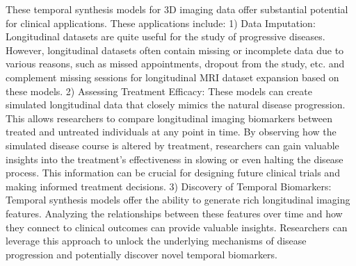 These temporal synthesis models for 3D imaging data offer substantial potential for clinical applications. These applications include: 1) Data Imputation: Longitudinal datasets are quite useful for the study of progressive diseases. However, longitudinal datasets often contain missing or incomplete data due to various reasons, such as missed appointments, dropout from the study, etc. \cite{fan2022tr} and \cite{fan2024tr} complement missing sessions for longitudinal MRI dataset expansion based on these models. 2) Assessing Treatment Efficacy: These models can create simulated longitudinal data that closely mimics the natural disease progression. This allows researchers to compare longitudinal imaging biomarkers between treated and untreated individuals at any point in time. By observing how the simulated disease course is altered by treatment, researchers can gain valuable insights into the treatment's effectiveness in slowing or even halting the disease process. This information can be crucial for designing future clinical trials and making informed treatment decisions. 3) Discovery of Temporal Biomarkers: Temporal synthesis models offer the ability to generate rich longitudinal imaging features. Analyzing the relationships between these features over time and how they connect to clinical outcomes can provide valuable insights. Researchers can leverage this approach to unlock the underlying mechanisms of disease progression and potentially discover novel temporal biomarkers.


